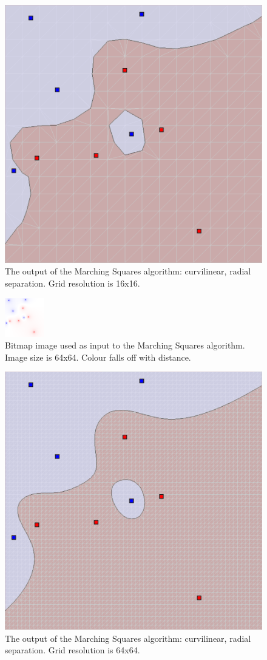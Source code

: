 \documentclass[12pt]{article}
\begin{document}
\begin{figure} 
\centering
  \includegraphics[width = 3 in]{16_res.png}
  \caption{The output of the Marching Squares algorithm: curvilinear, radial separation. Grid resolution is 16x16.
}
\end{figure}



\begin{figure} 
\centering
  \includegraphics[width = 3 in]{64_res_image.png}
  \caption{Bitmap image used as input to the Marching Squares algorithm. 
Image size is 64x64.
Colour falls off with distance.
}
\end{figure}

\begin{figure} 
\centering
  \includegraphics[width = 3 in]{64_res.png}
  \caption{The output of the Marching Squares algorithm: curvilinear, radial separation. Grid resolution is 64x64.
}
\end{figure}
\end{document}
